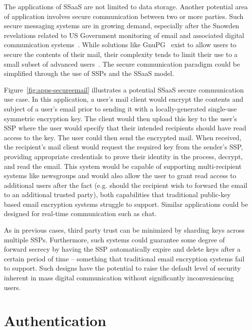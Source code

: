 The applications of SSaaS are not limited to data storage. Another
potential area of application involves secure communication between
two or more parties. Such secure messaging systems are in growing
demand, especially after the Snowden revelations related to US
Government monitoring of email and associated digital communication
systems~\cite{gellman-muscular, greenwald-collect,
  greenwald-prism}. While solutions like GnuPG~\cite{gnupg} exist to
allow users to secure the contents of their mail, their complexity
tends to limit their use to a small subset of advanced
users~\cite{green-challenge, whitten1999}. The secure communication
paradigm could be simplified through the use of SSPs and the SSaaS
model.

Figure~\ref{fig:apps-secureemail} illustrates a potential SSaaS secure
communication use case. In this application, a user's mail client
would encrypt the contents and subject of a user's email prior to
sending it with a locally-generated single-use symmetric encryption
key. The client would then upload this key to the user's SSP where the
user would specify that their intended recipients should have read
access to the key. The user could then send the encrypted mail. When
received, the recipient's mail client would request the required key
from the sender's SSP, providing appropriate credentials to prove
their identity in the process, decrypt, and read the email. This
system would be capable of supporting multi-recipient systems like
newsgroups and would also allow the user to grant read access to
additional users after the fact (e.g. should the recipient wish to
forward the email to an additional trusted party), both capabilities
that traditional public-key based email encryption systems struggle to
support. Similar applications could be designed for real-time
communication such as chat.

As in previous cases, third party trust can be minimized by sharding
keys across multiple SSPs. Furthermore, such systems could guarantee
some degree of forward secrecy by having the SSP automatically expire
and delete keys after a certain period of time -- something that
traditional email encryption systems fail to support. Such designs
have the potential to raise the default level of security inherent in
mass digital communication without significantly inconveniencing
users.

\section{Authentication}

